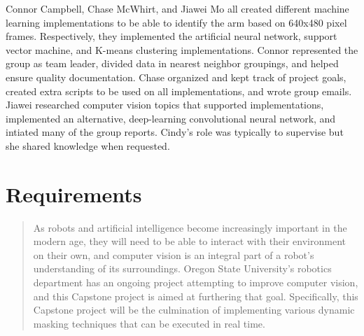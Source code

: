 \documentclass[10pt,journal,compsoc, draftclsnofoot,onecolumn]{IEEEtran}
\begin{document}
\noindent
Connor Campbell, Chase McWhirt, and Jiawei Mo all created different machine learning implementations to be able to identify the arm based on 640x480 pixel frames.
Respectively, they implemented the artificial neural network, support vector machine, and K-means clustering implementations.
Connor represented the group as team leader, divided data in nearest neighbor groupings, and helped ensure quality documentation.
Chase organized and kept track of project goals, created extra scripts to be used on all implementations, and wrote group emails.
Jiawei researched computer vision topics that supported implementations, implemented an alternative, deep-learning convolutional neural network, and intiated many of the group reports.
Cindy's role was typically to supervise but she shared knowledge when requested.


\newpage
\section{Requirements}

\begin{abstract}
As robots and artificial intelligence become increasingly important in the modern age, they will need to be able to interact with their environment on their own, and computer vision is an integral part of a robot's understanding of its surroundings.
Oregon State University's robotics department has an ongoing project attempting to improve computer vision, and this Capstone project is aimed at furthering that goal.
Specifically, this Capstone project will be the culmination of implementing various dynamic masking techniques that can be executed in real time.
\end{abstract}
\end{document}
